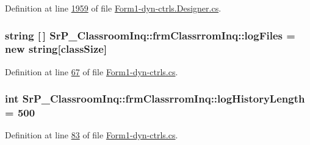 \-Definition at line \hyperlink{_form1-dyn-ctrls_8_designer_8cs_source_l01959}{1959} of file \hyperlink{_form1-dyn-ctrls_8_designer_8cs_source}{\-Form1-\/dyn-\/ctrls.\-Designer.\-cs}.

\hypertarget{class_sr_p___classroom_inq_1_1frm_classrrom_inq_a1b23b6935997df29f1b06ed831495076}{
\subsubsection[{log\-Files}]{\setlength{\rightskip}{0pt plus 5cm}string \mbox{[}$\,$\mbox{]} {\bf \-Sr\-P\-\_\-\-Classroom\-Inq\-::frm\-Classrrom\-Inq\-::log\-Files} = new string\mbox{[}{\bf class\-Size}\mbox{]}}}
\label{class_sr_p___classroom_inq_1_1frm_classrrom_inq_a1b23b6935997df29f1b06ed831495076}


\-Definition at line \hyperlink{_form1-dyn-ctrls_8cs_source_l00067}{67} of file \hyperlink{_form1-dyn-ctrls_8cs_source}{\-Form1-\/dyn-\/ctrls.\-cs}.

\hypertarget{class_sr_p___classroom_inq_1_1frm_classrrom_inq_a0b55eb955abb243808249457ac92ca93}{
\subsubsection[{log\-History\-Length}]{\setlength{\rightskip}{0pt plus 5cm}int {\bf \-Sr\-P\-\_\-\-Classroom\-Inq\-::frm\-Classrrom\-Inq\-::log\-History\-Length} = 500}}
\label{class_sr_p___classroom_inq_1_1frm_classrrom_inq_a0b55eb955abb243808249457ac92ca93}


\-Definition at line \hyperlink{_form1-dyn-ctrls_8cs_source_l00083}{83} of file \hyperlink{_form1-dyn-ctrls_8cs_source}{\-Form1-\/dyn-\/ctrls.\-cs}.

